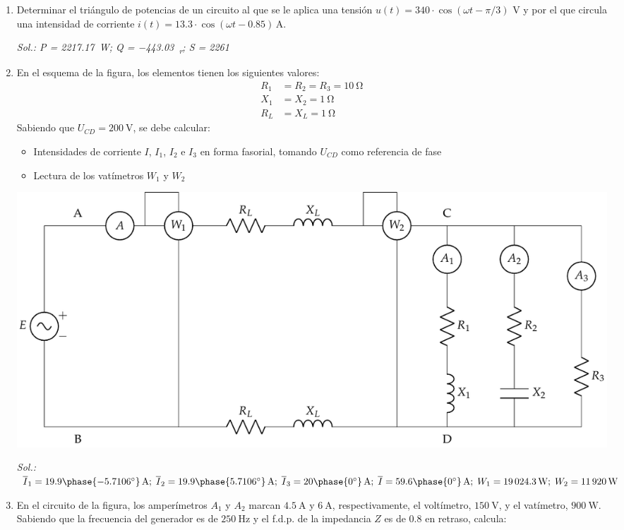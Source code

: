 \begin{enumerate}
\item Determinar el triángulo de potencias de un circuito al que se le
aplica una tensión $u(t)=340 \cdot \cos(\omega t - \pi/3)$ V y
por el que circula una intensidad de corriente
$i(t)= 13.3 \cdot \cos(\omega t-0.85)\,\si{\ampere}$.
  
  \emph{Sol.:\;  P =
    \qty{2217.17}{\watt};\; Q = \qty{-443.03}{\voltampere_r};\; S =
    \qty{2261}{\voltampere} }

\item En el esquema de la figura, los elementos tienen los siguientes valores:
    \begin{align*}
      R_1 &= R_2 = R_3 = \qty{10}{\ohm}\\
      X_1 &= X_2 = \qty{1}{\ohm}\\
      R_L &= X_L = \qty{1}{\ohm}
    \end{align*}
  Sabiendo que $U_{CD} = \qty{200}{\volt}$, se debe calcular:
    \begin{itemize}
    \item Intensidades de corriente $I$, $I_1$, $I_2$ e $I_3$ {en forma
        fasorial}, tomando $U_{CD}$ como referencia de fase
    \item Lectura de los vatímetros $W_1$ y $W_2$
    \end{itemize}
  \begin{center}
    \includegraphics[width=\linewidth]{../figs/ej8_BT2.pdf}
  \end{center}

  \emph{Sol.:\;
    $\overline{I}_1=19.9\phase{-5.7106^\circ}\,\si{\ampere};\;
    \overline{I}_2=19.9\phase{5.7106^\circ}\,\si{\ampere};\;
    \overline{I}_3=20\phase{\ang{0}}\,\si{\ampere};\;\overline{I}=59.6\phase{\ang{0}}\,\si{\ampere};\;W_1=\qty{19024.3}{\watt};\;
    W_2=\qty{11920}{\watt}$}

\item En el circuito de la figura, los amperímetros $A_1$ y $A_2$ marcan $\qty{4.5}{\ampere}$ y $\qty{6}{\ampere}$, respectivamente, el voltímetro, $\qty{150}{\volt}$, y el vatímetro, $\qty{900}{\watt}$. Sabiendo que la frecuencia del generador es de $\qty{250}{\hertz}$ y el f.d.p. de la impedancia $Z$ es de $0.8$ en retraso, calcula:


\end{enumerate}
